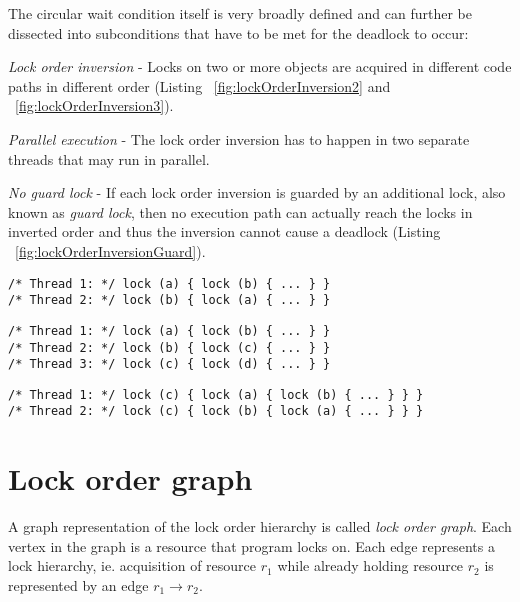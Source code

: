 The circular wait condition itself is very broadly defined and can further be dissected into subconditions that have to be met for the deadlock to occur:
\begin{itemize*}
\item \emph{Lock order inversion} - Locks on two or more objects are acquired in different code paths in different order (Listing ~\ref{fig:lockOrderInversion2} and ~\ref{fig:lockOrderInversion3}).
\item \emph{Parallel execution} - The lock order inversion has to happen in two separate threads that may run in parallel.
\item \emph{No guard lock} - If each lock order inversion is guarded by an additional lock, also known as \emph{guard lock}, then no execution path can actually reach the locks in inverted order and thus the inversion cannot cause a deadlock (Listing ~\ref{fig:lockOrderInversionGuard}).
\end{itemize*}

\begin{lstlisting}[language=CSharp,caption=Lock order inversion with 2 resources,label=fig:lockOrderInversion2]
/* Thread 1: */ lock (a) { lock (b) { ... } }
/* Thread 2: */ lock (b) { lock (a) { ... } }
\end{lstlisting}

\begin{lstlisting}[language=CSharp,caption=Lock order inversion with 3 resources,label=fig:lockOrderInversion3]
/* Thread 1: */ lock (a) { lock (b) { ... } }
/* Thread 2: */ lock (b) { lock (c) { ... } }
/* Thread 3: */ lock (c) { lock (d) { ... } }
\end{lstlisting}

\begin{lstlisting}[language=CSharp,caption=Lock order inversion protected by guard lock,label=fig:lockOrderInversionGuard]
/* Thread 1: */ lock (c) { lock (a) { lock (b) { ... } } }
/* Thread 2: */ lock (c) { lock (b) { lock (a) { ... } } }
\end{lstlisting}

\section{Lock order graph}

A graph representation of the lock order hierarchy is called \emph{lock order graph}. Each vertex in the graph is a resource that program locks on. Each edge represents a lock hierarchy, ie. acquisition of resource $r_1$ while already holding resource $r_2$ is represented by an edge $r_1 \rightarrow r_2$.

